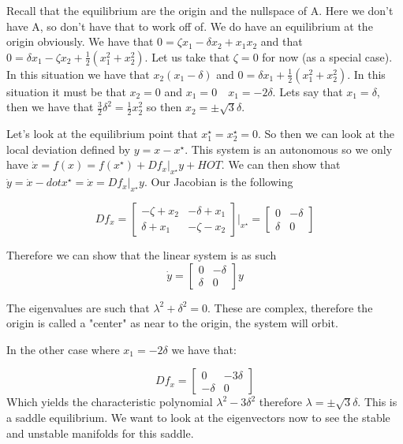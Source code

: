 \documentclass[11pt]{article}
\begin{document}
Recall that the equilibrium are the origin and the nullspace of A. Here we don't have A, so don't have that to work off of. We do have an equilibrium at the origin obviously. We have that $0=\zeta x_1 - \delta x_2 + x_1x_2 $ and that $0=\delta x_1 -\zeta x_2 + \frac{1}{2}(x_1^2 + x_2^2)$. Let us take that $\zeta = 0$ for now (as a special case). In this situation we have that $x_2(x_1 - \delta)$ and $0=\delta x_1 + \frac{1}{2}(x_1^2 + x_2^2)$. In this situation it must be that $x_2 = 0$ and $x_1 = 0 \quad x_1 = -2\delta$. Lets say that $x_1 = \delta$, then we have that $\frac{3}{2}\delta^2 = \frac{1}{2}x_2^2$ so then $x_2 = \pm \sqrt{3}\delta$.

Let's look at the equilibrium point that $x_1^\star = x_2^\star = 0$. So then we can look at the local deviation defined by $y = x - x^\star$. This system is an autonomous so we only have $\dot{x} = f(x) = f(x^\star) + Df_x\lvert_{x^\star}y + HOT$. We can then show that $\dot{y} = \dot{x} - dot{x^\star} = \dot{x} = Df_x\lvert_{x^\star}y$. Our Jacobian is the following

\begin{equation}
Df_x = 
\begin{bmatrix}
-\zeta + x_2 & -\delta +x_1 \\
\delta + x_1 & -\zeta -x_2	
\end{bmatrix}
\bigg\lvert_{x^\star} = 	
\begin{bmatrix}
0 & -\delta \\
\delta & 0
\end{bmatrix}
\end{equation}

Therefore we can show that the linear system is as such 
\begin{equation}
\dot{y} = 
\begin{bmatrix}
0 & -\delta \\
\delta & 0
\end{bmatrix} y
\end{equation}

The eigenvalues are such that $\lambda^2 + \delta^2 = 0$. These are complex, therefore the origin is called a "center" as near to the origin, the system will orbit.

In the other case where $x_1 = -2\delta$ we have that:

\begin{equation}
Df_x = 
\begin{bmatrix}
0 & -3\delta \\
-\delta & 0
\end{bmatrix}
\end{equation}
Which yields the characteristic polynomial $\lambda^2 - 3\delta^2$ therefore $\lambda = \pm \sqrt{3} \delta$. This is a saddle equilibrium. We want to look at the eigenvectors now to see the stable and unstable manifolds for this saddle. 
\end{document}
